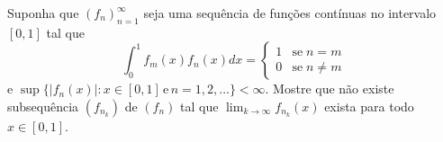 Suponha que \((f_{n})_{n=1}^{\infty}\) seja uma sequência de funções contínuas no intervalo \([0,1]\) tal que
\[\int_{0}^{1}f_{m}(x)f_{n}(x) dx=
\begin{cases} 
1& \text{se}\;n=m\\
 0 & \text{se} \;n\ne m
\end{cases}\]
e \(\sup\{|f_{n}(x)|: x\in [0,1]\, \text{e}\, n=1,2,\dots\}< \infty\).
Mostre que não existe subsequência \((f_{n_{k}})\) de \((f_{n})\) tal que \(\lim_{k\to \infty}f_{n_{k}}(x)\) exista para todo \(x\in [0,1]\).
